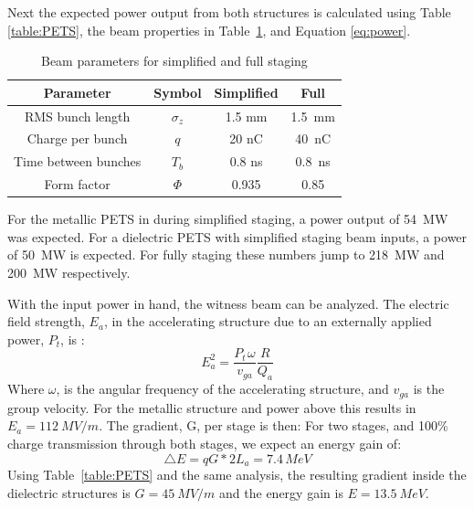 Next the expected power output from both structures is calculated using Table \ref{table:PETS}, 
the beam properties in Table~\ref{table:beam1}, and Equation \ref{eq:power}. 
\begin{table}
	\begin{center}
		\caption{Beam parameters for simplified and full staging}
		\label{table:beam1}
		\begin{tabular}{cccc}  
			\toprule
			\toprule
			\textbf{Parameter} & \textbf{Symbol} & \textbf{Simplified} & \textbf{Full} \\
			\midrule
			RMS bunch length & $\sigma_{z}$ & 1.5 mm & \SI{1.5}{mm}\\  
			Charge per bunch & $q$ & 20 nC & \SI{40}{nC}\\  
			Time between bunches & $T_{b}$ & 0.8 ns & \SI{0.8}{ns}\\  
			Form factor 		 & $\Phi$ & 0.935 & \SI{0.85}{}\\  
			\bottomrule
		\end{tabular}
	\end{center}
\end{table}
For the metallic PETS in during simplified staging, a power output of \SI{54}{MW} was expected.
For a dielectric PETS with simplified staging beam inputs, a power of \SI{50}{MW} is expected.
For fully staging these numbers jump to \SI{218}{MW} and \SI{200}{MW} respectively. 

With the input power in hand, the witness beam can be analyzed. 
The electric field strength, $E_{a}$, in 
the accelerating structure due to an externally applied power,
$P_{t}$, is \cite{wangler}: 
\begin{equation}
E_{a}^{2}=\frac{P_{t\,}\omega}{v_{ga}}\frac{R}{Q_a}
\label{eq:electricfield}
\end{equation}
Where $\omega$, is the angular frequency of the accelerating structure,
and $v_{ga}$ is the group velocity. 
For the metallic structure and power above this results in $E_a=\SI{112}{MV/m}$.
The gradient, G, per stage is then: 
For two stages, and 100\% charge transmission through both stages,
we expect an energy gain of: 
\begin{equation}
\triangle E=qG*2L_{a}=7.4\,MeV
\end{equation}
Using Table~\ref{table:PETS} and the same analysis, 
the resulting gradient inside the dielectric structures is
$G=\SI{45}{MV/m}$ and the energy gain is $E = \SI{13.5}{MeV}$.


